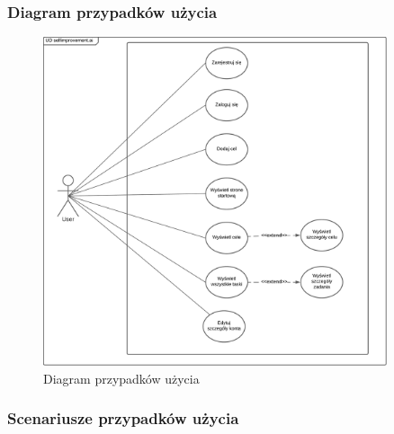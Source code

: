 \subsubsection{Diagram przypadków użycia}

\begin{figure}[h]
    \centering
    \includegraphics[width=0.9\textwidth]{Obrazy/diagrams/use_case_diagram.png}
    \caption{Diagram przypadków użycia}
    \label{fig:my_label}
\end{figure}

\subsubsection{Scenariusze przypadków użycia}

